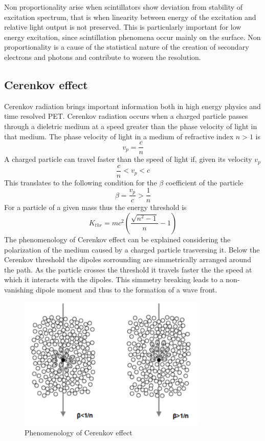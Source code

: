 Non proportionality arise when scintillators show deviation from stability of excitation spectrum, that is when linearity between energy of the excitation and relative light output is not preserved. This is particularly important for low energy excitation, since scintillation phenomena occur mainly on the surface. Non proportionality is a cause of the statistical nature of the creation of secondary electrons and photons and contribute to worsen the resolution.
\newpage
\subsection{Cerenkov effect}
Cerenkov radiation brings important information both in high energy physics and time resolved PET.
Cerenkov radiation occurs when a charged particle passes through a dieletric medium at a speed greater than the phase velocity of light in that medium.
The phase velocity of light in a medium of refractive index $n > 1$ is
\begin{equation}
v_{p} = \frac{c}{n}
\end{equation}
A charged particle can travel faster than the speed of light if, given its velocity $v_{p}$ 
\begin{equation}
\frac{c}{n} < v_{p} < c
\end{equation}
This translates to the following condition for the $\beta$ coefficient of the particle
\begin{equation}
\beta = \frac{v_{p}}{c} > \frac{1}{n}
\end{equation}
For a particle of a given mass thus the energy threshold is
\begin{equation}
K_{thr} = mc^{2}\left( \frac{\sqrt {n^{2}-1}}{n} - 1 \right)
\label{eq:thr}
\end{equation}
The phenomenology of Cerenkov effect can be explained considering the polarization of the medium caused by a charged particle trasversing it.
Below the Cerenkov threshold the dipoles sorrounding are simmetrically arranged around the path. As the particle crosses the threshold it travels faster the the speed at which it interacts with the dipoles. This simmetry breaking leads to a non-vanishing dipole moment and thus to the formation of a wave front.

\begin{figure}
\centering
\includegraphics[width=9cm]{../Pictures/Chapter_2/cerenkov.pdf}
\caption[Cerenkov effect]{Phenomenology of Cerenkov effect}
\label{fig:cerenkov}
\end{figure}

